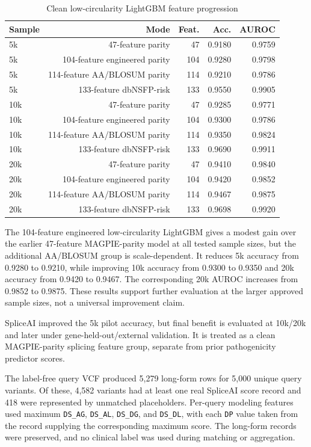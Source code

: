 \documentclass[conference]{IEEEtran}
\begin{document}
\begin{table}[t]
\centering
\scriptsize
\caption{Clean low-circularity LightGBM feature progression}
\label{tab:improved-low-circularity}
\begin{tabular}{lrrrr}
\toprule
Sample & Mode & Feat. & Acc. & AUROC \\
\midrule
5k & 47-feature parity & 47 & 0.9180 & 0.9759 \\
5k & 104-feature engineered parity & 104 & 0.9280 & 0.9798 \\
5k & 114-feature AA/BLOSUM parity & 114 & 0.9210 & 0.9786 \\
5k & 133-feature dbNSFP-risk & 133 & 0.9550 & 0.9905 \\
10k & 47-feature parity & 47 & 0.9285 & 0.9771 \\
10k & 104-feature engineered parity & 104 & 0.9300 & 0.9786 \\
10k & 114-feature AA/BLOSUM parity & 114 & 0.9350 & 0.9824 \\
10k & 133-feature dbNSFP-risk & 133 & 0.9690 & 0.9911 \\
20k & 47-feature parity & 47 & 0.9410 & 0.9840 \\
20k & 104-feature engineered parity & 104 & 0.9420 & 0.9852 \\
20k & 114-feature AA/BLOSUM parity & 114 & 0.9467 & 0.9875 \\
20k & 133-feature dbNSFP-risk & 133 & 0.9698 & 0.9920 \\
\bottomrule
\end{tabular}
\end{table}

The 104-feature engineered low-circularity LightGBM gives a modest gain over the earlier 47-feature MAGPIE-parity model at all tested sample sizes, but the additional AA/BLOSUM group is scale-dependent. It reduces 5k accuracy from 0.9280 to 0.9210, while improving 10k accuracy from 0.9300 to 0.9350 and 20k accuracy from 0.9420 to 0.9467. The corresponding 20k AUROC increases from 0.9852 to 0.9875. These results support further evaluation at the larger approved sample sizes, not a universal improvement claim.

SpliceAI improved the 5k pilot accuracy, but final benefit is evaluated at 10k/20k and later under gene-held-out/external validation. It is treated as a clean MAGPIE-parity splicing feature group, separate from prior pathogenicity predictor scores.

The label-free query VCF produced 5,279 long-form rows for 5,000 unique query variants. Of these, 4,582 variants had at least one real SpliceAI score record and 418 were represented by unmatched placeholders. Per-query modeling features used maximum \texttt{DS\_AG}, \texttt{DS\_AL}, \texttt{DS\_DG}, and \texttt{DS\_DL}, with each \texttt{DP} value taken from the record supplying the corresponding maximum score. The long-form records were preserved, and no clinical label was used during matching or aggregation.
\end{document}
